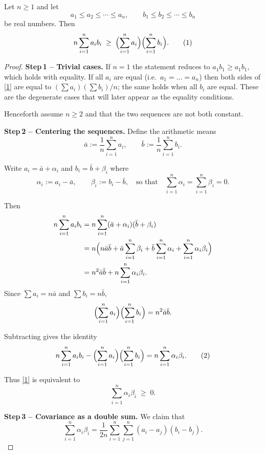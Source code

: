 \begin{theorem}
Let $n\ge 1$ and let
\[
a_{1}\le a_{2}\le\cdots\le a_{n},\qquad
b_{1}\le b_{2}\le\cdots\le b_{n}
\]
be real numbers.  Then
\[
n\sum_{i=1}^{n}a_i b_i\;\ge\;
\Bigl(\sum_{i=1}^{n}a_i\Bigr)\Bigl(\sum_{i=1}^{n}b_i\Bigr).
\tag{1}
\]
\end{theorem}

\begin{proof}
\textbf{Step 1 – Trivial cases.}  
If $n=1$ the statement reduces to $a_{1}b_{1}\ge a_{1}b_{1}$, which holds with equality.  
If all $a_i$ are equal (i.e.\ $a_{1}=\dots =a_{n}$) then both sides of \eqref{1} are equal to $(\sum a_i)(\sum b_i)/n$; the same holds when all $b_i$ are equal.  These are the degenerate cases that will later appear as the equality conditions.

Henceforth assume $n\ge2$ and that the two sequences are not both constant.

\medskip
\textbf{Step 2 – Centering the sequences.}  
Define the arithmetic means
\[
\bar a:=\frac1n\sum_{i=1}^{n}a_i,\qquad
\bar b:=\frac1n\sum_{i=1}^{n}b_i .
\]

Write $a_i=\bar a+\alpha_i$ and $b_i=\bar b+\beta_i$ where
\[
\alpha_i:=a_i-\bar a,\qquad \beta_i:=b_i-\bar b,
\quad\text{so that}\quad
\sum_{i=1}^{n}\alpha_i=
\sum_{i=1}^{n}\beta_i=0 .
\]

Then
\begin{align*}
n\sum_{i=1}^{n}a_i b_i
&=n\sum_{i=1}^{n}(\bar a+\alpha_i)(\bar b+\beta_i)   \\
&=n\Bigl( n\bar a\bar b
        +\bar a\sum_{i=1}^{n}\beta_i
        +\bar b\sum_{i=1}^{n}\alpha_i
        +\sum_{i=1}^{n}\alpha_i\beta_i\Bigr)                \\
&=n^{2}\bar a\bar b + n\sum_{i=1}^{n}\alpha_i\beta_i .
\end{align*}
Since $\sum a_i = n\bar a$ and $\sum b_i = n\bar b$,
\[
\Bigl(\sum_{i=1}^{n}a_i\Bigr)\Bigl(\sum_{i=1}^{n}b_i\Bigr)
= n^{2}\bar a\bar b .
\]

Subtracting gives the identity
\[
n\sum_{i=1}^{n}a_i b_i-
\Bigl(\sum_{i=1}^{n}a_i\Bigr)\Bigl(\sum_{i=1}^{n}b_i\Bigr)
= n\sum_{i=1}^{n}\alpha_i\beta_i . \tag{2}
\]

Thus \eqref{1} is equivalent to
\[
\sum_{i=1}^{n}\alpha_i\beta_i\;\ge\;0 . \tag{2'}
\]

\medskip
\textbf{Step 3 – Covariance as a double sum.}  
We claim that
\[
\sum_{i=1}^{n}\alpha_i\beta_i
=\frac{1}{2n}\sum_{i=1}^{n}\sum_{j=1}^{n}
   (a_i-a_j)(b_i-b_j). \tag{3}
\]


\end{proof}
